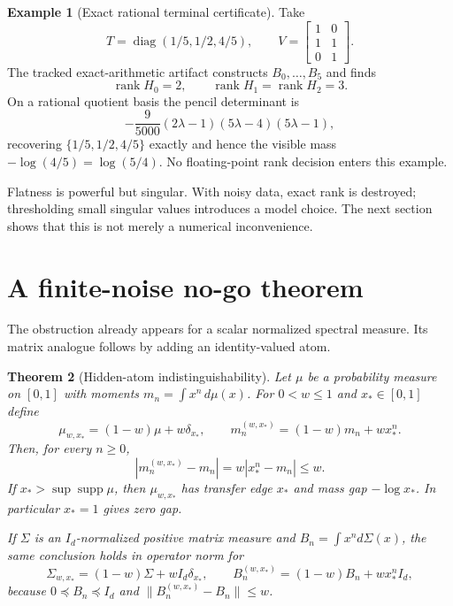 \documentclass[11pt]{article}
\newtheorem{theorem}{Theorem}[section]
\theoremstyle{definition}
\newtheorem{example}[theorem]{Example}
\theoremstyle{remark}
\newcommand{\rank}{\operatorname{rank}}
\newcommand{\supp}{\operatorname{supp}}
\begin{document}
\begin{example}[Exact rational terminal certificate]    \label{ex:rational}
Take
\[
 T=\operatorname{diag}(1/5,1/2,4/5),\qquad
 V=\begin{bmatrix}1&0\\1&1\\0&1\end{bmatrix}.
\]
The tracked exact-arithmetic artifact constructs $B_0,\ldots,B_5$ and finds
\[
 \rank H_0=2,\qquad \rank H_1=\rank H_2=3.
\]
On a rational quotient basis the pencil determinant is
\begin{equation}
 -\frac9{5000}(2\lambda-1)(5\lambda-4)(5\lambda-1),
\end{equation}
recovering $\{1/5,1/2,4/5\}$ exactly and hence the visible mass
$-\log(4/5)=\log(5/4)$.  No floating-point rank decision enters this example.
\end{example}

Flatness is powerful but singular.  With noisy data, exact rank is destroyed;
thresholding small singular values introduces a model choice.  The next
section shows that this is not merely a numerical inconvenience.

\section{A finite-noise no-go theorem}

The obstruction already appears for a scalar normalized spectral measure.
Its matrix analogue follows by adding an identity-valued atom.

\begin{theorem}[Hidden-atom indistinguishability]        \label{thm:nogo}
Let $\mu$ be a probability measure on $[0,1]$ with moments
$m_n=\int x^n\,d\mu(x)$.  For $0<w\leq1$ and $x_*\in[0,1]$ define
\begin{equation}
 \mu_{w,x_*}=(1-w)\mu+w\delta_{x_*},
 \qquad m_n^{(w,x_*)}=(1-w)m_n+wx_*^n.                \label{eq:hiddenatom}
\end{equation}
Then, for every $n\geq0$,
\begin{equation}
  |m_n^{(w,x_*)}-m_n|=w|x_*^n-m_n|\leq w.             \label{eq:hiddenbound}
\end{equation}
If $x_*>\sup\supp\mu$, then $\mu_{w,x_*}$ has transfer edge $x_*$ and mass
gap $-\log x_*$.  In particular $x_*=1$ gives zero gap.

If $\Sigma$ is an $I_d$-normalized positive matrix measure and
$B_n=\int x^n d\Sigma(x)$, the same conclusion holds in operator norm for
\begin{equation}
 \Sigma_{w,x_*}=(1-w)\Sigma+w I_d\delta_{x_*},
 \qquad B_n^{(w,x_*)}=(1-w)B_n+wx_*^nI_d,
\end{equation}
because $0\preceq B_n\preceq I_d$ and
$\|B_n^{(w,x_*)}-B_n\|\leq w$.
\end{theorem}
\end{document}
